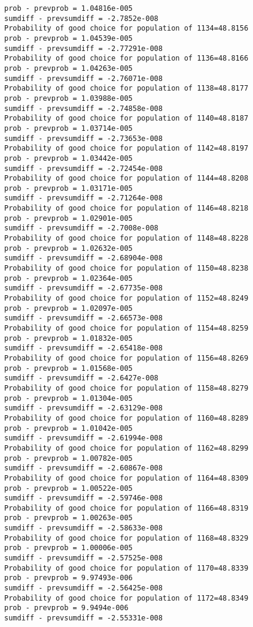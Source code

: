 \documentclass[11pt,onecolumn]{article}
\begin{document}
\begin{verbatim}
prob - prevprob = 1.04816e-005
sumdiff - prevsumdiff = -2.7852e-008
Probability of good choice for population of 1134=48.8156
prob - prevprob = 1.04539e-005
sumdiff - prevsumdiff = -2.77291e-008
Probability of good choice for population of 1136=48.8166
prob - prevprob = 1.04263e-005
sumdiff - prevsumdiff = -2.76071e-008
Probability of good choice for population of 1138=48.8177
prob - prevprob = 1.03988e-005
sumdiff - prevsumdiff = -2.74858e-008
Probability of good choice for population of 1140=48.8187
prob - prevprob = 1.03714e-005
sumdiff - prevsumdiff = -2.73653e-008
Probability of good choice for population of 1142=48.8197
prob - prevprob = 1.03442e-005
sumdiff - prevsumdiff = -2.72454e-008
Probability of good choice for population of 1144=48.8208
prob - prevprob = 1.03171e-005
sumdiff - prevsumdiff = -2.71264e-008
Probability of good choice for population of 1146=48.8218
prob - prevprob = 1.02901e-005
sumdiff - prevsumdiff = -2.7008e-008
Probability of good choice for population of 1148=48.8228
prob - prevprob = 1.02632e-005
sumdiff - prevsumdiff = -2.68904e-008
Probability of good choice for population of 1150=48.8238
prob - prevprob = 1.02364e-005
sumdiff - prevsumdiff = -2.67735e-008
Probability of good choice for population of 1152=48.8249
prob - prevprob = 1.02097e-005
sumdiff - prevsumdiff = -2.66573e-008
Probability of good choice for population of 1154=48.8259
prob - prevprob = 1.01832e-005
sumdiff - prevsumdiff = -2.65418e-008
Probability of good choice for population of 1156=48.8269
prob - prevprob = 1.01568e-005
sumdiff - prevsumdiff = -2.6427e-008
Probability of good choice for population of 1158=48.8279
prob - prevprob = 1.01304e-005
sumdiff - prevsumdiff = -2.63129e-008
Probability of good choice for population of 1160=48.8289
prob - prevprob = 1.01042e-005
sumdiff - prevsumdiff = -2.61994e-008
Probability of good choice for population of 1162=48.8299
prob - prevprob = 1.00782e-005
sumdiff - prevsumdiff = -2.60867e-008
Probability of good choice for population of 1164=48.8309
prob - prevprob = 1.00522e-005
sumdiff - prevsumdiff = -2.59746e-008
Probability of good choice for population of 1166=48.8319
prob - prevprob = 1.00263e-005
sumdiff - prevsumdiff = -2.58633e-008
Probability of good choice for population of 1168=48.8329
prob - prevprob = 1.00006e-005
sumdiff - prevsumdiff = -2.57525e-008
Probability of good choice for population of 1170=48.8339
prob - prevprob = 9.97493e-006
sumdiff - prevsumdiff = -2.56425e-008
Probability of good choice for population of 1172=48.8349
prob - prevprob = 9.9494e-006
sumdiff - prevsumdiff = -2.55331e-008

\end{verbatim}
\end{document}
